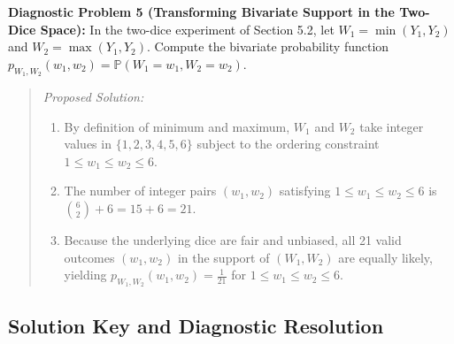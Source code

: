 \documentclass[11pt, letterpaper]{article}
\theoremstyle{definition}
\theoremstyle{remark}
\newcommand{\Prob}{\mathbb{P}}
\begin{document}
\textbf{Diagnostic Problem 5 (Transforming Bivariate Support in the Two-Dice Space):}
In the two-dice experiment of Section 5.2, let $W_1 = \min(Y_1, Y_2)$ and $W_2 = \max(Y_1, Y_2)$. Compute the bivariate probability function $p_{W_1, W_2}(w_1, w_2) = \Prob(W_1 = w_1, W_2 = w_2)$.
\begin{quote}
\emph{Proposed Solution:}
\begin{enumerate}[label=\textbf{Step \arabic*:}]
    \item By definition of minimum and maximum, $W_1$ and $W_2$ take integer values in $\{1, 2, 3, 4, 5, 6\}$ subject to the ordering constraint $1 \le w_1 \le w_2 \le 6$.
    \item The number of integer pairs $(w_1, w_2)$ satisfying $1 \le w_1 \le w_2 \le 6$ is $\binom{6}{2} + 6 = 15 + 6 = 21$.
    \item Because the underlying dice are fair and unbiased, all 21 valid outcomes $(w_1, w_2)$ in the support of $(W_1, W_2)$ are equally likely, yielding $p_{W_1, W_2}(w_1, w_2) = \frac{1}{21}$ for $1 \le w_1 \le w_2 \le 6$.
\end{enumerate}
\end{quote}

\newpage
\subsection{Solution Key and Diagnostic Resolution}
\label{sec:solution_key}
\end{document}
